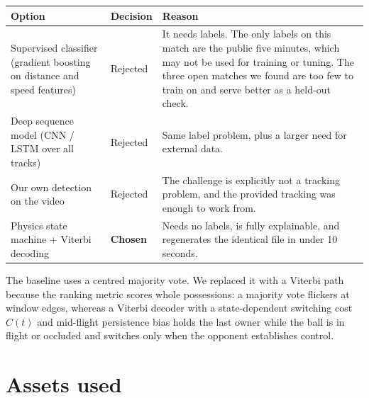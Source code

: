 \documentclass[11pt,a4paper]{article}
\begin{document}
\begin{center}
\begin{tabularx}{\textwidth}{@{}>{\raggedright\arraybackslash}p{4.2cm} l Y@{}}
\toprule
\textbf{Option} & \textbf{Decision} & \textbf{Reason} \\
\midrule
Supervised classifier (gradient boosting on distance and speed features) & Rejected &
  It needs labels. The only labels on this match are the public five minutes, which may not be
  used for training or tuning. The three open matches we found are too few to train on and serve
  better as a held-out check. \\
Deep sequence model (CNN / LSTM over all tracks) & Rejected &
  Same label problem, plus a larger need for external data. \\
Our own detection on the video & Rejected &
  The challenge is explicitly not a tracking problem, and the provided tracking was enough to
  work from. \\
Physics state machine + Viterbi decoding & \textbf{Chosen} &
  Needs no labels, is fully explainable, and regenerates the identical file in under 10 seconds. \\
\bottomrule
\end{tabularx}
\end{center}

The baseline uses a centred majority vote. We replaced it with a Viterbi path because the ranking
metric scores whole possessions: a majority vote flickers at window edges, whereas a Viterbi
decoder with a state-dependent switching cost $C(t)$ and mid-flight persistence bias holds the
last owner while the ball is in flight or occluded and switches only when the opponent establishes
control.

\section{Assets used}
\end{document}
